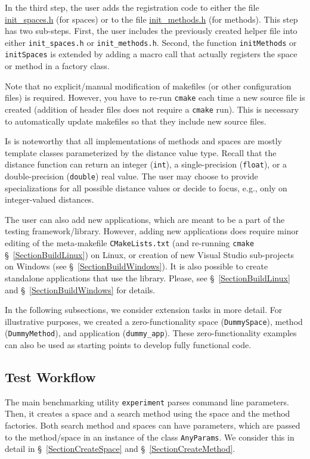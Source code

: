 \documentclass[runningheads,a4paper]{llncs}
\newcommand{\replocfile}{https://github.com/searchivarius/NonMetricSpaceLib/blob/pserv/}
\newcommand{\ttt}[1]{\texttt{#1}}
\begin{document}
In the third step, the user adds 
the registration code to either the file 
\href{\replocfile similarity_search/include/factory/init_spaces.h}{init\_spaces.h} (for spaces)
or to the file
\href{\replocfile similarity_search/include/factory/init_methods.h}{init\_methods.h} (for methods).
This step has two sub-steps. 
First, the user includes the previously created helper file into either
\ttt{init\_spaces.h} or \ttt{init\_methods.h}.
Second, the function \ttt{initMethods} or \ttt{initSpaces} is extended
by adding a macro call that actually registers the space or method in a factory class.

Note that no explicit/manual modification of makefiles (or other configuration files) is required.
However, you have to re-run \ttt{cmake} each time a new source file is created (addition
of header files does not require a \ttt{cmake} run). This is necessary to automatically update makefiles so that they include new source files.

Is is noteworthy that all implementations of methods and spaces
are mostly template classes parameterized by the distance value type.
Recall that the distance function can return an integer (\ttt{int}), 
a single-precision (\ttt{float}), or a double-precision (\ttt{double}) real value.
The user may choose to provide specializations for all possible
distance values or decide to focus, e.g., only on integer-valued distances.

The user can also add new applications, which are meant to be 
a part of the testing framework/library.
However, adding new applications does require minor editing of the meta-makefile \ttt{CMakeLists.txt} 
(and re-running \ttt{cmake} \S~\ref{SectionBuildLinux}) on Linux,
or creation of new Visual Studio sub-projects on Windows (see \S~\ref{SectionBuildWindows}).
It is also possible to create standalone applications that use the library.
Please, see \S~\ref{SectionBuildLinux} and \S~\ref{SectionBuildWindows} for details.

In the following subsections, 
we consider extension tasks in more detail.
For illustrative purposes,
we created a zero-functionality space (\ttt{DummySpace}), 
method (\ttt{DummyMethod}), and application (\ttt{dummy\_app}).
These zero-functionality examples can also be used as starting points to develop fully functional code.

\subsection{Test Workflow}\label{SectionWorkflow}
The main benchmarking utility \ttt{experiment} parses command line parameters. 
Then, it creates a space and a search method using the space and the method factories.
Both search method and spaces can have parameters,
which are passed to the method/space in an instance
of the class \ttt{AnyParams}. We consider this in detail in \S~\ref{SectionCreateSpace} and \S~\ref{SectionCreateMethod}.
\end{document}
